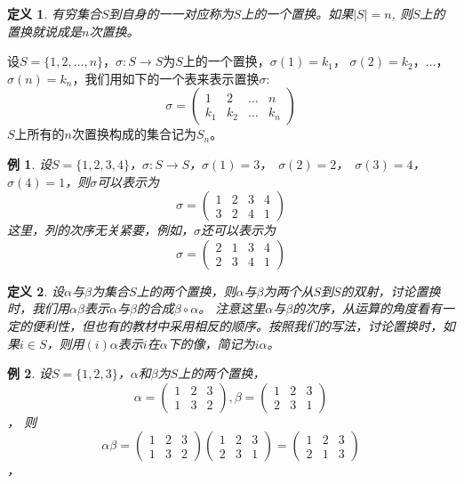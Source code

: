 \documentclass{article}
\newtheorem{Def}{定义}
\newtheorem*{Example}{例}
\begin{document}
\begin{CJK*}{UTF8}{gbsn}
  \begin{Def}
    有穷集合$S$到自身的一一对应称为$S$上的一个置换。如果$|S| = n$, 则$S$上的置换就说成是$n$次置换。
  \end{Def}
设$S=\{1,2,\ldots,n\}$，$\sigma:S\to S$为$S$上的一个置换，$\sigma(1) = k_1$， $\sigma(2) = k_2$，$\ldots$，$\sigma(n) = k_n$，我们用如下的一个表来表示置换$\sigma$:
\[\sigma=\begin{pmatrix}1&2&\ldots&n\\k_1&k_2&\ldots&k_n\end{pmatrix}\]
$S$上所有的$n$次置换构成的集合记为$S_n$。
\begin{Example}
  设$S=\{1,2,3,4\}$，$\sigma:S\to S$，$\sigma(1) = 3$，　$\sigma(2) = 2$，　$\sigma(3) = 4$，　$\sigma(4) = 1$，则$\sigma$可以表示为
  \[\sigma=\begin{pmatrix}1&2&3&4\\3&2&4&1\end{pmatrix}\]
  这里，列的次序无关紧要，例如，$\sigma$还可以表示为
  \[\sigma=\begin{pmatrix}2&1&3&4\\2&3&4&1\end{pmatrix}\]
\end{Example}

  \begin{Def}
    设$\alpha$与$\beta$为集合$S$上的两个置换，则$\alpha$与$\beta$为两个从$S$到$S$的双射，讨论置换时，我们用$\alpha\beta$表示$\alpha$与$\beta$的合成$\beta \circ \alpha$。
    注意这里$\alpha$与$\beta$的次序，从运算的角度看有一定的便利性，但也有的教材中采用相反的顺序。按照我们的写法，讨论置换时，如果$i \in S$，则用$(i)\alpha$表示$i$在$\alpha$下的像，简记为$i\alpha$。
  \end{Def}
  \begin{Example}
    设$S=\{1,2,3\}$，$\alpha$和$\beta$为$S$上的两个置换，
    \[\alpha=\begin{pmatrix}1&2&3\\1&3&2\end{pmatrix},\beta=\begin{pmatrix}1&2&3\\2&3&1\end{pmatrix}\]，
    则
    \[\alpha\beta=\begin{pmatrix}1&2&3\\1&3&2\end{pmatrix}\begin{pmatrix}1&2&3\\2&3&1\end{pmatrix}=\begin{pmatrix}1&2&3\\2&1&3\end{pmatrix}\]，    
  \end{Example}


\end{CJK*}
\end{document}
